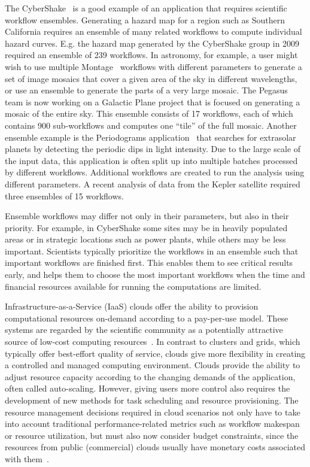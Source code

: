 \documentclass[conference]{IEEEtran}
\begin{document}
The CyberShake~\cite{Callaghan2011} is a good example of an application that
requires scientific workflow ensembles. Generating a hazard map for a region
such as Southern California requires an ensemble of many related workflows to
compute individual hazard curves. E.g. the hazard map generated by the
CyberShake group in 2009 required an ensemble of 239 workflows. In astronomy,
for example, a user might wish to use multiple Montage~\cite{Deelman2008}
workflows with different parameters to generate a set of image mosaics that
cover a given area of the sky in different wavelengths, or use an ensemble to generate
the parts of a very large mosaic. The Pegasus team is now working on a Galactic
Plane project that is focused on generating a mosaic of the entire sky. This
ensemble consists of 17 workflows, each of which contains 900 sub-workflows and
computes one ``tile'' of the full mosaic. Another ensemble example is the
Periodograms application~\cite{Vockler2011} that searches for extrasolar planets
by detecting the periodic dips in light intensity. Due to the large scale of the
input data, this application is often split up into multiple batches processed
by different workflows. Additional workflows are created to run the analysis
using different parameters. A recent analysis of data from the Kepler satellite
required three ensembles of 15 workflows.


Ensemble workflows may differ not only in their parameters, but also in their
priority. For example, in CyberShake some sites may be in heavily populated
areas or in strategic locations such as power plants, while others may be less
important. Scientists typically prioritize the workflows in an ensemble such
that important workflows are finished first. This enables them to see critical
results early, and helps them to choose the most important workflows when the
time and financial resources available for running the computations are limited.

Infrastructure-as-a-Service (IaaS) clouds offer the ability to provision 
computational resources on-demand according to a pay-per-use model. These systems 
are regarded by the scientific community as a potentially attractive source of 
low-cost computing resources~\cite{Ostermann2010, Keahey2009}. In contrast 
to clusters and grids, which typically offer best-effort quality of service, clouds 
give more flexibility in creating a controlled and managed computing environment.
Clouds provide the ability to adjust resource capacity according to the changing
demands of the application, often called auto-scaling. However, giving users 
more control also requires the development of new methods for task 
scheduling and resource provisioning. The resource management decisions required 
in cloud scenarios not only have to take into account traditional performance-related 
metrics such as workflow makespan or resource utilization, but must also now consider
budget constraints, since the resources from public (commercial) clouds
usually have monetary costs associated with them~\cite{Durkee2010}.
\end{document}

